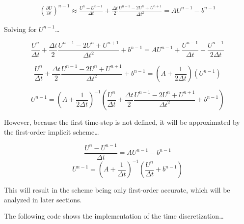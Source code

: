 \documentclass[12pt,letterpaper]{article}
\begin{document}
\begin{equation*}
    \begin{aligned}
    \left(\frac{\partial U}{\partial t}\right)^{n-1} \approx \frac{U^{n}-U^{n-1}}{\Delta t} + \frac{\Delta t}{2}\frac{U^{n-1}-2U^{n}+U^{n+1}}{\Delta t^2} = AU^{n-1} - b^{n-1}
    \end{aligned}
\end{equation*}

Solving for $U^{n-1}$\ldots

\begin{equation*}
    \frac{U^{n}}{\Delta t} + \frac{\Delta t}{2}\frac{U^{n-1}-2U^{n}+U^{n+1}}{\Delta t^2} + b^{n-1} = AU^{n-1} + \frac{U^{n-1}}{\Delta t} - \frac{U^{n-1}}{2\Delta t} 
\end{equation*}

\begin{equation*}
    \frac{U^{n}}{\Delta t} + \frac{\Delta t}{2}\frac{U^{n-1}-2U^{n}+U^{n+1}}{\Delta t^2} + b^{n-1} = \left(A + \frac{1}{2\Delta t}\right)(U^{n-1})
\end{equation*}

\begin{equation*}
    U^{n-1} = \left(A + \frac{1}{2\Delta t}\right)^{-1} \left(\frac{U^{n}}{\Delta t} + \frac{\Delta t}{2}\frac{U^{n-1}-2U^{n}+U^{n+1}}{\Delta t^2} + b^{n-1}\right)
\end{equation*}

However, because the first time-step is not defined, it will be approximated by the first-order implicit scheme\ldots

\begin{equation*}
    \frac{U^{n}-U^{n-1}}{\Delta t} = AU^{n-1} - b^{n-1}
\end{equation*}
\begin{equation*}
    U^{n-1} = \left(A + \frac{1}{\Delta t}\right)^{-1} \left(\frac{U^{n}}{\Delta t} + b^{n-1}\right)
\end{equation*}

This will result in the scheme being only first-order accurate, which will be analyzed in later sections.

The following code shows the implementation of the time discretization\ldots
\end{document}
